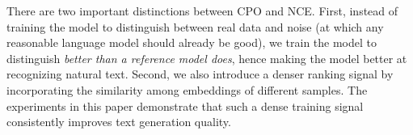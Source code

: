 There are two important distinctions between CPO and NCE. First, instead of training the model to distinguish between real data and noise (at which any reasonable language model should already be good), we train the model to distinguish \textit{better than a reference model does}, hence making the model better at recognizing natural text. Second, we also introduce a denser ranking signal by incorporating the similarity among embeddings of different samples. The experiments in this paper demonstrate that such a dense training signal consistently improves text generation quality.
